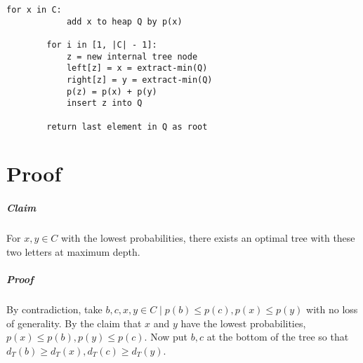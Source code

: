 \documentclass[11pt]{article}
\begin{document}
	\begin{lstlisting}[autogobble=true]
		for x in C:
			add x to heap Q by p(x)
			
		for i in [1, |C| - 1]:
			z = new internal tree node
			left[z] = x = extract-min(Q)
			right[z] = y = extract-min(Q)
			p(z) = p(x) + p(y)
			insert z into Q
			
		return last element in Q as root
	\end{lstlisting}
	
\section{Proof}
	\subparagraph{Claim} For $x, y \in C$ with the lowest probabilities, there exists an optimal tree with these two letters at maximum depth.
	\subparagraph{Proof} By contradiction, take $b, c, x, y \in C \mid p(b) \leq p(c), p(x) \leq p(y)$ with no loss of generality. By the claim that $x$ and $y$ have the lowest probabilities, $p(x) \leq p(b), p(y) \leq p(c)$. Now put $b, c$ at the bottom of the tree so that $d_T(b) \geq d_T(x), d_T(c) \geq d_T(y)$.
	
\end{document}

